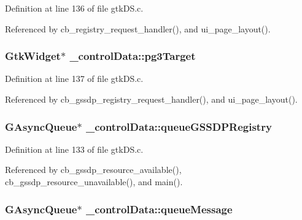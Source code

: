 Definition at line 136 of file gtk\+D\+S.\+c.



Referenced by cb\+\_\+registry\+\_\+request\+\_\+handler(), and ui\+\_\+page\+\_\+layout().

\hypertarget{struct__control_data_a67d45a0e9ba1fcaabea3600dfee830b9}{
\subsubsection[{pg3\+Target}]{\setlength{\rightskip}{0pt plus 5cm}Gtk\+Widget$\ast$ \+\_\+control\+Data\+::pg3\+Target}}\label{struct__control_data_a67d45a0e9ba1fcaabea3600dfee830b9}


Definition at line 137 of file gtk\+D\+S.\+c.



Referenced by cb\+\_\+gssdp\+\_\+registry\+\_\+request\+\_\+handler(), and ui\+\_\+page\+\_\+layout().

\hypertarget{struct__control_data_ad4c1f099018b51b0faeae870d284819d}{
\subsubsection[{queue\+G\+S\+S\+D\+P\+Registry}]{\setlength{\rightskip}{0pt plus 5cm}G\+Async\+Queue$\ast$ \+\_\+control\+Data\+::queue\+G\+S\+S\+D\+P\+Registry}}\label{struct__control_data_ad4c1f099018b51b0faeae870d284819d}


Definition at line 133 of file gtk\+D\+S.\+c.



Referenced by cb\+\_\+gssdp\+\_\+resource\+\_\+available(), cb\+\_\+gssdp\+\_\+resource\+\_\+unavailable(), and main().

\hypertarget{struct__control_data_adc74ddf3f6a7535eee87d39ed80ee7dd}{
\subsubsection[{queue\+Message}]{\setlength{\rightskip}{0pt plus 5cm}G\+Async\+Queue$\ast$ \+\_\+control\+Data\+::queue\+Message}}\label{struct__control_data_adc74ddf3f6a7535eee87d39ed80ee7dd}



